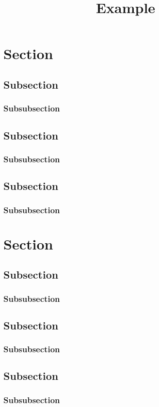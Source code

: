 \documentclass[a4paper]{article}
\title{Example}
\begin{document}
\blindtext{}
\section{Section}
\subsection{Subsection}
\subsubsection{Subsubsection}
\subsection{Subsection}
\subsubsection{Subsubsection}
\subsection{Subsection}
\subsubsection{Subsubsection}

\section{Section}
\subsection{Subsection}
\subsubsection{Subsubsection}
\subsection{Subsection}
\subsubsection{Subsubsection}
\subsection{Subsection}
\subsubsection{Subsubsection}
\end{document}
